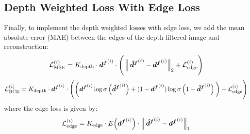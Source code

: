\subsection{Depth Weighted Loss With Edge Loss}
\label{sec:8_edge_depth}
Finally, to implement the depth weighted losses with edge loss, we add the mean absolute error (MAE) between the edges of the depth filtered image and reconstruction:
\begin{equation}
    \mathcal{L}^{(i)}_{\text{MSE}} = K_\text{depth} \cdot \boldsymbol{d^f}^{(i)} \cdot \Bigg (\left\lVert\, \boldsymbol{\hat{d}^f}^{(i)} - \boldsymbol{d^f}^{(i)}\right\rVert_2 
    + \mathcal{L}^{(i)}_{\text{edge}}
    \Bigg)
    \label{eq:8_mse_edge_depth_weighted_loss}
\end{equation}
\begin{equation}
    \mathcal{L}^{(i)}_{\text{BCE}} =  K_\text{depth} \cdot \boldsymbol{d^f}^{(i)} \cdot \Bigg( \bigg(\boldsymbol{d^f}^{(i)} \log \sigma\left(\boldsymbol{\hat{d}^f}^{(i)}\right) +  (1 - \boldsymbol{d^f}^{(i)}) \log \sigma\left(1 - \boldsymbol{\hat{d}^f}^{(i)}\right) \bigg) 
    + \mathcal{L}^{(i)}_{\text{edge}}
    \Bigg)
    \label{eq:8_bce_edge_depth_weighted_loss}
\end{equation}
where the edge loss is given by:
\begin{equation}
    \mathcal{L}^{(i)}_{\text{edge}} = K_\text{edge} \cdot E\Big(\boldsymbol{d^f}^{(i)}\Big) \cdot \left\lVert\, \boldsymbol{\hat{d}^f}^{(i)} - \boldsymbol{d^f}^{(i)}\right\rVert_1
\end{equation}

